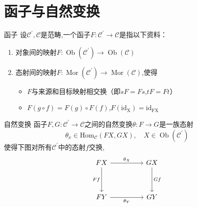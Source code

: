 \documentclass[../../几何与拓扑.tex]{subfiles}
\begin{document}
\section{函子与自然变换}

\begin{definition}{函子 }
    设$\mathcal{C^{\prime}},\mathcal{C}$是范畴,一个函子$F:\mathcal{C^{\prime}}\to \mathcal{C}$是指以下资料：
    \begin{enumerate}
        \item 对象间的映射$F:\operatorname{Ob}{\left( \mathcal{C}^{\prime} \right)}\to \operatorname{Ob}{\left( \mathcal{C} \right)}$
        \item 态射间的映射$F:\operatorname{Mor}{\left( \mathcal{C^{\prime}} \right)}\to \operatorname{Mor}{\left( \mathcal{C} \right)}$,使得
           \begin{itemize}
            \item $F$与来源和目标映射相交换（即$sF=Fs$,$tF=Ft$）
            \item $F\left( g\circ f \right)=F\left( g \right)\circ F\left( f \right)$,$F\left( \operatorname{id_{X}}\right)=\operatorname{id_{FX}}$
           \end{itemize}
    \end{enumerate}
    
    
\end{definition}

\begin{definition}{自然变换}
    函子$F,G:\mathcal{C}^{\prime}\to \mathcal{C}$之间的自然变换$\theta:F\to G$是一族态射 $$ \theta _{x}\in \operatorname{Hom_{\mathcal{C}}}{\left( FX,GX \right) },\quad X \in \operatorname{Ob}{\left( \mathcal{C}^{\prime} \right) } $$使得下图对所有$\mathcal{C}^{\prime}$中的态射$f$交换,
    \[
        \begin{tikzcd} FX && GX \\ \\ FY && GY \arrow["{\theta_X}", from=1-1, to=1-3] \arrow["Ff"', from=1-1, to=3-1] \arrow["Gf", from=1-3, to=3-3] \arrow["{\theta_Y}"', from=3-1, to=3-3] \end{tikzcd} 
    \]
\end{definition}
\end{document}
